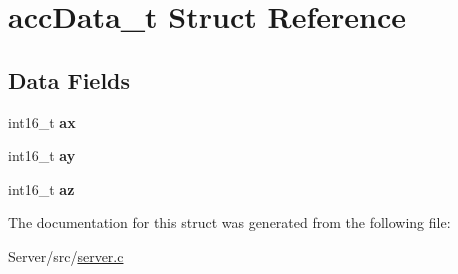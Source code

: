 \hypertarget{structaccData__t}{}\section{acc\+Data\+\_\+t Struct Reference}
\label{structaccData__t}
\subsection*{Data Fields}
\begin{DoxyCompactItemize}
\item 
int16\+\_\+t {\bfseries ax}\hypertarget{structaccData__t_a025c59daf3f7c97adf5bc740ad5b0d66}{}\label{structaccData__t_a025c59daf3f7c97adf5bc740ad5b0d66}

\item 
int16\+\_\+t {\bfseries ay}\hypertarget{structaccData__t_a4c8f5fd42fa0e215b46a5479edc2b99f}{}\label{structaccData__t_a4c8f5fd42fa0e215b46a5479edc2b99f}

\item 
int16\+\_\+t {\bfseries az}\hypertarget{structaccData__t_ad5cf4ad96fd9ced76276ed29c18c4c66}{}\label{structaccData__t_ad5cf4ad96fd9ced76276ed29c18c4c66}

\end{DoxyCompactItemize}


The documentation for this struct was generated from the following file\+:\begin{DoxyCompactItemize}
\item 
Server/src/\hyperlink{server_8c}{server.\+c}\end{DoxyCompactItemize}
